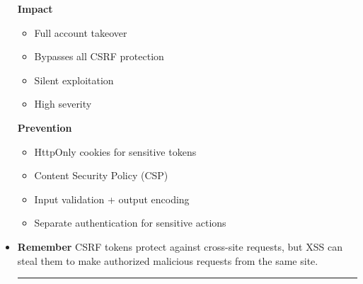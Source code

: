 \documentclass{article}
\begin{document}
\begin{itemize}
\subitem \textbf{Impact}
\begin{itemize}
\item Full account takeover
\item Bypasses all CSRF protection
\item Silent exploitation
\item High severity
\end{itemize}

\subitem \textbf{Prevention}
\begin{itemize}
\item HttpOnly cookies for sensitive tokens
\item Content Security Policy (CSP)
\item Input validation + output encoding
\item Separate authentication for sensitive actions
\end{itemize}

\item \textbf{Remember}
CSRF tokens protect against cross-site requests, but XSS can steal them to make authorized malicious requests from the same site.\\
\rule{5cm}{0.4pt}

\end{itemize}
\end{document}
